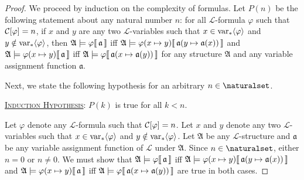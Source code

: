 \begin{proof}
    We proceed by induction on the complexity of formulas. Let \( P(n) \) be the following statement about any natural number \( n \):
    for all \( \mathcal{L} \)-formula \( \varphi \) such that \( \folcomplexityofformula{\varphi} = n \), if \( x \) and \( y \)
    are any two \( \mathcal{L} \)-variables such that \( x \in \operatorname{var}_{\ast} \langle\varphi\rangle \) and \( y \notin \operatorname{var}_{\ast} \langle\varphi\rangle \),
    then \(  \mathfrak{A} \models \varphi\llbracket\, \mathfrak{a} \,\rrbracket \) iff \( \folwffsatisfaction{\mathfrak{A}}{ \folfreevariablereplacement{\varphi}{x}{y} }{ \folmodifiedvariableassignmentfunction{\mathfrak{a}}{y}{ \mathfrak{a}(x) } }\) and
    \( \folwffsatisfaction{\mathfrak{A}}{ \folfreevariablereplacement{\varphi}{x}{y} }{\mathfrak{a}} \) iff
    \( \folwffsatisfaction{\mathfrak{A}}{ \varphi }{ \folmodifiedvariableassignmentfunction{\mathfrak{a}}{x}{\mathfrak{a}(y)} } \)
    for any structure \( \mathfrak{A} \) and any variable assignment function \( \mathfrak{a} \).

    \vspace{0.3cm}
    \noindent
    Next, we state the following hypothesis for an arbitrary \( n \in \naturalset \).

    \vspace{0.3cm}
    \noindent
    \underline{\scshape Induction Hypothesis}: \( P(k) \) is true for all \( k < n \).

    \vspace{0.3cm}
    \noindent
    Let \( \varphi \) denote any \( \mathcal{L} \)-formula such that \( \folcomplexityofformula{\varphi} = n \).
    Let \( x \) and \( y \) denote any two \( \mathcal{L} \)-variables such that \( x \in \operatorname{var}_{\ast} \langle\varphi\rangle \) and \( y \notin \operatorname{var}_{\ast} \langle\varphi\rangle \).
    Let \( \mathfrak{A} \) be any \( \mathcal{L} \)-structure and \( \mathfrak{a} \) be any variable assignment function of \( \mathcal{L} \) under \( \mathfrak{A} \).
    Since \( n \in \naturalset \), either \( n = 0 \) or \( n \neq 0 \).
    We must show that 
    \(  \mathfrak{A} \models \varphi\llbracket\, \mathfrak{a} \,\rrbracket \) iff \( \folwffsatisfaction{\mathfrak{A}}{ \folfreevariablereplacement{\varphi}{x}{y} }{ \folmodifiedvariableassignmentfunction{\mathfrak{a}}{y}{ \mathfrak{a}(x) } }\) and
    \( \folwffsatisfaction{\mathfrak{A}}{ \folfreevariablereplacement{\varphi}{x}{y} }{\mathfrak{a}} \) iff
    \( \folwffsatisfaction{\mathfrak{A}}{ \varphi }{ \folmodifiedvariableassignmentfunction{\mathfrak{a}}{x}{\mathfrak{a}(y)} } \)
    are true in both cases.


\end{proof}
